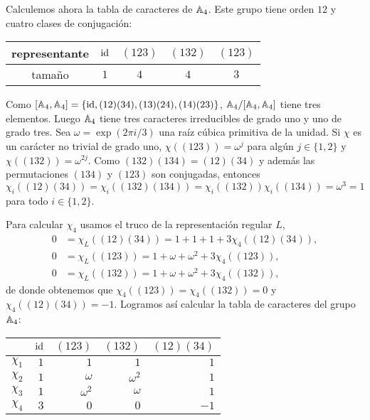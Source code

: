 \begin{example}
	Calculemos ahora la tabla de caracteres de $\mathbb{A}_4$. Este grupo tiene orden $12$ y 
	cuatro clases de conjugación:
	\begin{center}
		\begin{tabular}{c|cccc}
			representante & $\operatorname{id}$ & $(123)$ & $(132)$ & $(123)$\tabularnewline
			\hline
			tamaño & $1$ & $4$ & $4$ & $3$ 
		\end{tabular}
	\end{center}
	Como $[\mathbb{A}_4,\mathbb{A}_4]=\{\operatorname{id},(12)(34),(13)(24),(14)(23)\}$,
	$\mathbb{A}_4/[\mathbb{A}_4,\mathbb{A}_4]$ tiene tres elementos. Luego $\mathbb{A}_4$ tiene tres
	caracteres irreducibles de grado uno y uno de grado tres. Sea
	$\omega=\exp(2\pi i/3)$ una raíz cúbica primitiva de la unidad. Si $\chi$
	es un carácter no trivial de grado uno, $\chi\left( (123) \right)=\omega^j$
	para algún $j\in\{1,2\}$ y $\chi\left( (132) \right)=\omega^{2j}$. Como 
	$(132)(134)=(12)(34)$ y además 
	las permutaciones $(134)$ y $(123)$ son conjugadas, entonces 
	\[
	\chi_i((12)(34))=\chi_i((132)(134))=\chi_i((132))\chi_i((134))=\omega^3=1
	\]
	para todo $i\in\{1,2\}$. 
	
	Para calcular $\chi_4$ usamos el truco de la representación regular $L$, 
	\begin{align*}
		0&=\chi_L\left( (12)(34) \right)=1+1+1+3\chi_4\left( (12)(34) \right),\\
		0&=\chi_L\left( (123) \right)=1+\omega+\omega^2+3\chi_4\left( (123) \right),\\
		0&=\chi_L\left( (132) \right)=1+\omega+\omega^2+3\chi_4\left( (132) \right),
	\end{align*}
	de donde obtenemos que $\chi_4\left( (123) \right)=\chi_4\left( (132)
	\right)=0$ y $\chi_4\left( (12)(34) \right)=-1$. Logramos así calcular la tabla de caracteres del grupo $\mathbb{A}_4$:
	\begin{center}
		\begin{tabular}{|c|rrrr|}
			\hline
			& $\operatorname{id}$ & $(123)$ & $(132)$ & $(12)(34)$\tabularnewline
			\hline
			$\chi_1$ & $1$ & $1$ & $1$ & $1$\tabularnewline
			$\chi_2$ & $1$ & $\omega$ & $\omega^2$ & $1$\tabularnewline
			$\chi_3$ & $1$ & $\omega^2$ & $\omega$ & $1$\tabularnewline
			$\chi_4$ & $3$ & $0$ & $0$ & $-1$\tabularnewline
			\hline
		\end{tabular}
	\end{center}
\end{example}

